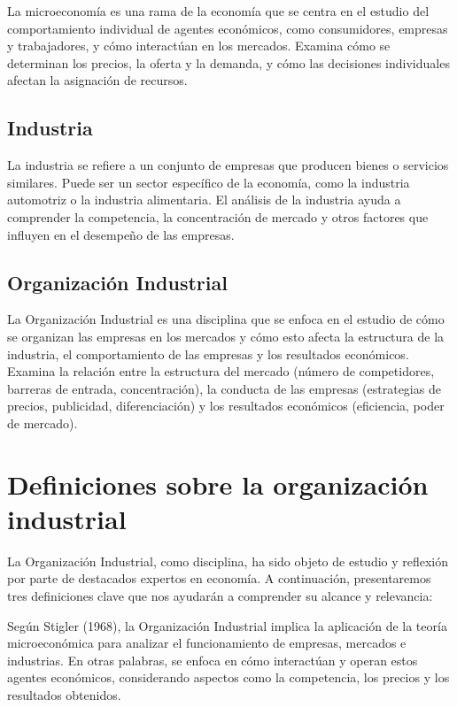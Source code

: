 \documentclass[
  letterpaper,
  DIV=11,
  numbers=noendperiod]{scrartcl}
\begin{document}
La microeconomía es una rama de la economía que se centra en el estudio
del comportamiento individual de agentes económicos, como consumidores,
empresas y trabajadores, y cómo interactúan en los mercados. Examina
cómo se determinan los precios, la oferta y la demanda, y cómo las
decisiones individuales afectan la asignación de recursos.

\hypertarget{industria}{%
\subsection{Industria}\label{industria}}

La industria se refiere a un conjunto de empresas que producen bienes o
servicios similares. Puede ser un sector específico de la economía, como
la industria automotriz o la industria alimentaria. El análisis de la
industria ayuda a comprender la competencia, la concentración de mercado
y otros factores que influyen en el desempeño de las empresas.

\hypertarget{organizaciuxf3n-industrial}{%
\subsection{Organización Industrial}\label{organizaciuxf3n-industrial}}

La Organización Industrial es una disciplina que se enfoca en el estudio
de cómo se organizan las empresas en los mercados y cómo esto afecta la
estructura de la industria, el comportamiento de las empresas y los
resultados económicos. Examina la relación entre la estructura del
mercado (número de competidores, barreras de entrada, concentración), la
conducta de las empresas (estrategias de precios, publicidad,
diferenciación) y los resultados económicos (eficiencia, poder de
mercado).

\hypertarget{definiciones-sobre-la-organizaciuxf3n-industrial}{%
\section{Definiciones sobre la organización
industrial}\label{definiciones-sobre-la-organizaciuxf3n-industrial}}

La Organización Industrial, como disciplina, ha sido objeto de estudio y
reflexión por parte de destacados expertos en economía. A continuación,
presentaremos tres definiciones clave que nos ayudarán a comprender su
alcance y relevancia:

Según Stigler (1968), la Organización Industrial implica la aplicación
de la teoría microeconómica para analizar el funcionamiento de empresas,
mercados e industrias. En otras palabras, se enfoca en cómo interactúan
y operan estos agentes económicos, considerando aspectos como la
competencia, los precios y los resultados obtenidos.
\end{document}
